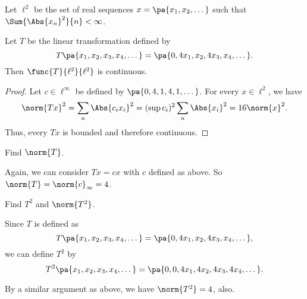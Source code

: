 \documentclass[12pt,letterpaper,twoside]{hmcpset}
\begin{document}
\begin{problem}[8][15]
 Let $\ell^2$ be the set of real sequences $x = \pa{x_1,x_2,\dotsc}$ such that $\Sum{\Abs{x_n}^2}{n} < \infty$.
\end{problem}

\begin{problem}[8a]
 Let $T$ be the linear transformation defined by \[T\pa{x_1,x_2,x_3,x_4,\dotsc} = \pa{0,4x_1,x_2,4x_3,x_4,\dotsc}.\] Then $\func{T}{\ell^2}{\ell^2}$ is continuous.
\end{problem}

\begin{solution}
 \begin{proof}
  Let $c \in \ell^\infty$ be defined by $\pa{0,4,1,4,1,\dotsc}$. For every $x 
\in \ell^2$, we have 
  \[\norm{Tx}^2 = \sum_n\Abs{c_i x_i}^2 = (\sup c_i)^2 \sum_n 
\Abs{x_i}^2=16\norm{x}^2.\]
Thus, every $Tx$ is bounded and therefore continuous.
 \end{proof}

\end{solution}


\begin{problem}[8b]
 Find $\norm{T}$.
\end{problem}

\begin{solution}
 Again, we can consider $Tx = cx$ with $c$ defined as above. So $\norm{T} = 
\norm{c}_\infty = 4$.
\end{solution}


\begin{problem}[8c]
 Find $T^2$ and $\norm{T^2}$.
\end{problem}

\begin{solution}
 Since $T$ is defined as \[T\pa{x_1,x_2,x_3,x_4,\dotsc} = \pa{0,4x_1,x_2,4x_3,x_4,\dotsc},\] we can define $T^2$ by \[T^2\pa{x_1,x_2,x_3,x_4,\dotsc} = \pa{0,0,4x_1,4x_2,4x_3,4x_4,\dotsc}.\]
 
 By a similar argument as above, we have $\norm{T^2} = 4$, also.
\end{solution}
\end{document}
